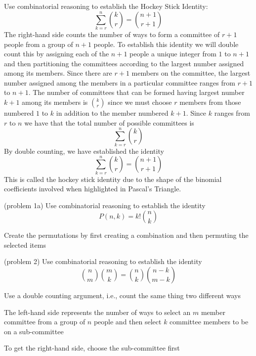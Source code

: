 \documentclass[handout]{ximera}
\begin{document}
\begin{example}[example 5]
Use combinatorial reasoning to establish the Hockey Stick Identity:
\[
\sum_{k=r}^{n}\binom{k}{r}=\binom{n+1}{r+1} %
\]
The right-hand side counts the number of ways to form a committee of $r+1$ people from a group of $n+1$ people.
To establish this identity we will double count this by assigning each of the $n+1$ people a unique 
integer from $1$ to $n+1$ and then partitioning the committees according to the largest number 
assigned among its members.
Since there are $r+1$ members on the committee, the largest number assigned among the 
members in a particular committee ranges from $r+1$ to $n+1$.
The number of committees that can be formed having largest number $k+1$ among its members
is $\binom{k}{r}$ since we must choose
$r$  members from those numbered $1$ to $k$ in addition to the member numbered $k+1$. 
Since $k$ ranges 
from $r$ to $n$ we have that the total number of possible committees is
\[
\sum_{k=r}^{n}\binom{k}{r}
\]
By double counting, we have established the identity
\[
\sum_{k=r}^{n}\binom{k}{r}=\binom{n+1}{r+1}
\]
This is called the hockey stick identity due to the shape of the binomial 
coefficients involved when highlighted in Pascal's Triangle.
\end{example}


\begin{problem}(problem 1a)
Use combinatorial reasoning to establish the identity
\[
P(n,k) = k!\binom{n}{k}
\]
\begin{hint}
Create the permutations by first creating a combination and then permuting the selected items
\end{hint}
\end{problem}

\begin{problem}(problem 2)
Use combinatorial reasoning to establish the identity
\[
\binom{n}{m} \binom{m}{k} = \binom{n}{k} \binom{n-k}{m-k}
\]
\begin{hint}
Use a double counting argument, i.e., count the same thing two different ways
\end{hint}
\begin{hint}
The left-hand side represents the number of ways to select an $m$ member committee from a group of $n$ people and then 
select $k$ committee members to be on a sub-committee
\end{hint}

\begin{hint}
To get the right-hand side, choose the sub-committee first
\end{hint}
\end{problem}
\end{document}
